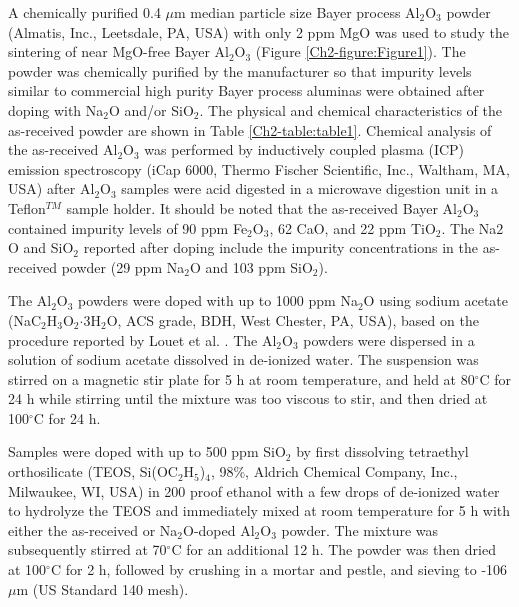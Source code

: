 A chemically purified 0.4 $\mu$m median particle size Bayer process Al$_{2}$O$_{3}$ powder (Almatis, Inc., Leetsdale, PA, USA) with only 2 ppm MgO was used to study the sintering of near MgO-free Bayer Al$_{2}$O$_{3}$ (Figure \ref{Ch2-figure:Figure1}). The powder was chemically purified by the manufacturer so that impurity levels similar to commercial high purity Bayer process aluminas were obtained after doping with Na$_{2}$O and/or SiO$_{2}$. The physical and chemical characteristics of the as-received powder are shown in Table \ref{Ch2-table:table1}. Chemical analysis of the as-received Al$_{2}$O$_{3}$ was performed by inductively coupled plasma (ICP) emission spectroscopy (iCap 6000, Thermo Fischer Scientific, Inc., Waltham, MA, USA) after Al$_{2}$O$_{3}$ samples were acid digested in a microwave digestion unit in a Teflon$^{TM}$ sample holder.  It should be noted that the as-received Bayer Al$_{2}$O$_{3}$ contained impurity levels of 90 ppm Fe$_{2}$O$_{3}$, 62 CaO, and 22 ppm TiO$_{2}$.  The Na${2}$O and SiO$_{2}$ reported after doping include the impurity concentrations in the as-received powder (29 ppm Na$_{2}$O and 103 ppm SiO$_{2}$). 

The Al$_{2}$O$_{3}$ powders were doped with up to 1000 ppm Na$_{2}$O using sodium acetate (NaC$_{2}$H$_{3}$O$_{2}$$\cdot$3H$_{2}$O, ACS grade, BDH, West Chester, PA, USA), based on the procedure reported by Louet et al. \cite{Louet2005a}. The Al$_{2}$O$_{3}$ powders were dispersed in a solution of sodium acetate dissolved in de-ionized water. The suspension was stirred on a magnetic stir plate for 5 h at room temperature, and held at 80$^{\circ}$C for 24 h while stirring until the mixture was too viscous to stir, and then dried at 100$^{\circ}$C for 24 h. 

Samples were doped with up to 500 ppm SiO$_{2}$ by first dissolving tetraethyl orthosilicate (TEOS, Si(OC$_{2}$H$_{5}$)$_{4}$, 98\%, Aldrich Chemical Company, Inc., Milwaukee, WI, USA) in 200 proof ethanol with a few drops of de-ionized water to hydrolyze the TEOS and immediately mixed at room temperature for 5 h with either the as-received or Na$_{2}$O-doped Al$_{2}$O$_{3}$ powder. The mixture was subsequently stirred at 70$^{\circ}$C for an additional 12 h. The powder was then dried at 100$^{\circ}$C for 2 h, followed by crushing in a mortar and pestle, and sieving to -106 $\mu$m (US Standard 140 mesh).

